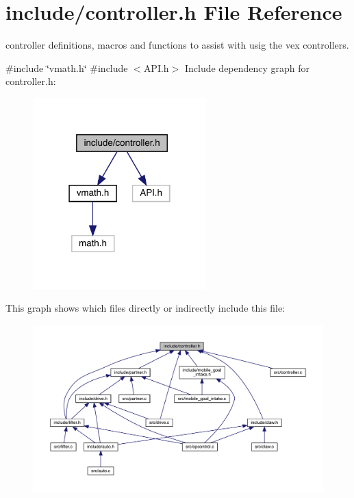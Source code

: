 \section{include/controller.h File Reference}
\label{controller_8h}


controller definitions, macros and functions to assist with usig the vex controllers.  


{\ttfamily \#include \char`\"{}vmath.\+h\char`\"{}}\newline
{\ttfamily \#include $<$A\+P\+I.\+h$>$}\newline
Include dependency graph for controller.\+h\+:
\nopagebreak
\begin{figure}[H]
\begin{center}
\leavevmode
\includegraphics[width=190pt]{controller_8h__incl}
\end{center}
\end{figure}
This graph shows which files directly or indirectly include this file\+:
\nopagebreak
\begin{figure}[H]
\begin{center}
\leavevmode
\includegraphics[width=350pt]{controller_8h__dep__incl}
\end{center}
\end{figure}
